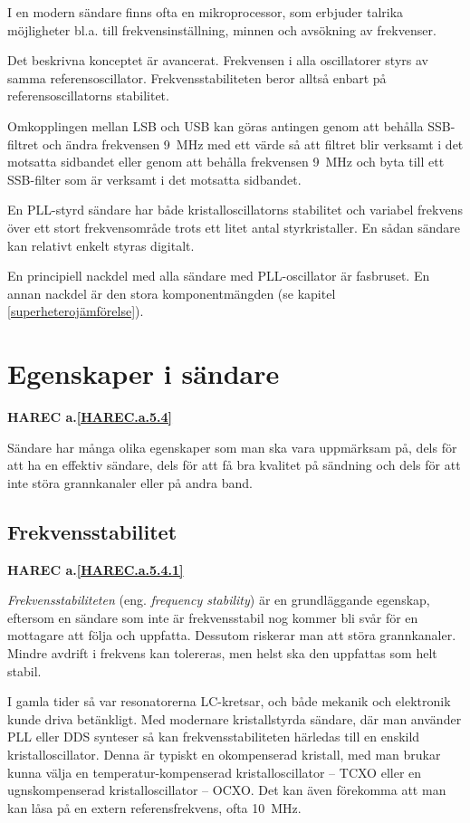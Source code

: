 I en modern sändare finns ofta en mikroprocessor, som erbjuder talrika
möjligheter bl.a. till frekvensinställning, minnen och avsökning av
frekvenser.

Det beskrivna konceptet är avancerat.
Frekvensen i alla oscillatorer styrs av samma referensoscillator.
Frekvensstabiliteten beror alltså enbart på referensoscillatorns stabilitet.

Omkopplingen mellan LSB och USB kan göras antingen genom att behålla
SSB-filtret och ändra frekvensen 9~MHz med ett värde så att filtret
blir verksamt i det motsatta sidbandet eller genom att behålla
frekvensen 9~MHz och byta till ett SSB-filter som är verksamt i det
motsatta sidbandet.

En PLL-styrd sändare har både kristalloscillatorns stabilitet och variabel
frekvens över ett stort frekvensområde trots ett litet antal styrkristaller.
En sådan sändare kan relativt enkelt styras digitalt.

En principiell nackdel med alla sändare med PLL-oscillator är fasbruset.
En annan nackdel är den stora komponentmängden
(se kapitel \ref{superheterojämförelse}).

\section{Egenskaper i sändare}
\textbf{HAREC
  a.\ref{HAREC.a.5.4}\label{myHAREC.a.5.4}
}

Sändare har många olika egenskaper som man ska vara uppmärksam på, dels för
att ha en effektiv sändare, dels för att få bra kvalitet på sändning och dels
för att inte störa grannkanaler eller på andra band.

\subsection{Frekvensstabilitet}
\textbf{HAREC
  a.\ref{HAREC.a.5.4.1}\label{myHAREC.a.5.4.1}
}

\emph{Frekvensstabiliteten} (eng. \emph{frequency stability}) är en
grundläggande egenskap, eftersom en sändare som inte är frekvensstabil nog
kommer bli svår för en mottagare att följa och uppfatta.
Dessutom riskerar man att störa grannkanaler.
Mindre avdrift i frekvens kan tolereras, men helst ska den uppfattas som
helt stabil.

I gamla tider så var resonatorerna LC-kretsar, och både mekanik och elektronik
kunde driva betänkligt.
Med modernare kristallstyrda sändare, där man använder PLL eller DDS
synteser så kan frekvensstabiliteten härledas till en enskild
kristalloscillator.
Denna är typiskt en okompenserad kristall, med man brukar kunna välja en
temperatur-kompenserad kristalloscillator -- TCXO eller en ugnskompenserad
kristalloscillator -- OCXO.
Det kan även förekomma att man kan låsa på en extern referensfrekvens,
ofta 10~MHz.

